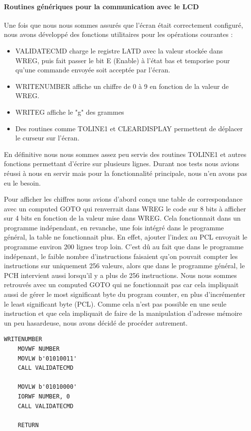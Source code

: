 \documentclass[a4paper,11pt,titlepage]{article}
\begin{document}
\paragraph{Routines génériques pour la communication avec le LCD}

Une fois que nous nous sommes assurés que l'écran était correctement configuré, nous avons développé des fonctions utilitaires pour les opérations courantes :
\begin{itemize}
  \item VALIDATECMD charge le registre LATD avec la valeur stockée dans WREG, puis fait passer le bit E (Enable) à l'état bas et temporise pour qu'une commande envoyée soit acceptée par l'écran.
  \item WRITENUMBER affiche un chiffre de 0 à 9 en fonction de la valeur de WREG.
  \item WRITEG affiche le "g" des grammes
  \item Des routines comme TOLINE1 et CLEARDISPLAY permettent de déplacer le curseur sur l'écran.
\end{itemize}

En définitive nous nous sommes assez peu servis des routines TOLINE1 et autres fonctions permettant d'écrire sur plusieurs lignes. Durant nos tests nous avions réussi à nous en servir mais pour la fonctionnalité principale, nous n'en avons pas eu le besoin.

Pour afficher les chiffres nous avions d'abord conçu une table de correspondance avec un computed GOTO qui renverrait dans WREG le code sur 8 bits à afficher sur 4 bits en fonction de la valeur mise dans WREG. Cela fonctionnait dans un programme indépendant, en revanche, une fois intégré dans le programme général, la table ne fonctionnait plus. En effet, ajouter l'index au PCL envoyait le programme environ 200 lignes trop loin. C'est dû au fait que dans le programme indépenant, le faible nombre d'instructions faisaient qu'on pouvait compter les instructions sur uniquement 256 valeurs, alors que dans le programme général, le PCH intervient aussi lorsqu'il y a plus de 256 instructions. Nous nous sommes retrouvés avec un computed GOTO qui ne fonctionnait pas car cela impliquait aussi de gérer le most significant byte du program counter, en plus d'incrémenter le least significant byte (PCL). Comme cela n'est pas possible en une seule instruction et que cela impliquait de faire de la manipulation d'adresse mémoire un peu hasardeuse, nous avons décidé de procéder autrement.

\begin{lstlisting}
WRITENUMBER
    MOVWF NUMBER
    MOVLW b'01010011'
    CALL VALIDATECMD
    
    MOVLW b'01010000'
    IORWF NUMBER, 0
    CALL VALIDATECMD
    
    RETURN	    
\end{lstlisting}
\end{document}
